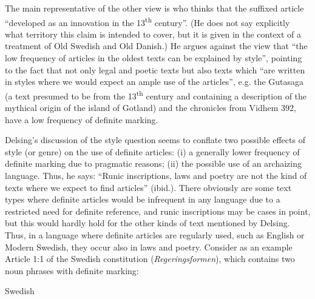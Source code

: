 \begin{styleBodytextC}
The main representative of the other view is \citet[938-939]{Delsing2002} who thinks that the suffixed article “developed as an innovation in the 13\textsuperscript{th} century”. (He does not say explicitly what territory this claim is intended to cover, but it is given in the context of a treatment of Old Swedish and Old Danish.) He argues against the view that “the low frequency of articles in the oldest texts can be explained by style”, pointing to the fact that not only legal and poetic texts but also texts which “are written in styles where we would expect an ample use of the articles”,  e.g. the Gutasaga (a text presumed to be from the 13\textsuperscript{th} century and containing a description of the mythical origin of the island of Gotland) and the chronicles from Vidhem 392, have a low frequency of definite marking. 

\end{styleBodytextC}

\begin{styleBodytextC}
Delsing’s discussion of the style question seems to conflate two possible effects of style (or genre) on the use of definite articles: (i) a generally lower frequency of definite marking due to pragmatic reasons; (ii) the possible use of an archaizing language. Thus, he says: “Runic inscriptions, laws and poetry are not the kind of texts where we expect to find articles” (ibid.). There obviously are some text types where definite articles would be infrequent in any language due to a restricted need for definite reference, and runic inscriptions may be cases in point, but this would hardly hold for the other kinds of text mentioned by Delsing. Thus, in a language where definite articles are regularly used, such as English or Modern Swedish, they occur also in laws and poetry. Consider as an example Article 1:1 of the Swedish constitution (\textit{Regeringsformen}), which contains two noun phrases with definite marking:

\end{styleBodytextC}

\begin{listWWNumileveli}
\item 

\begin{styleExample}
Swedish

\end{styleExample}

\end{listWWNumileveli}

